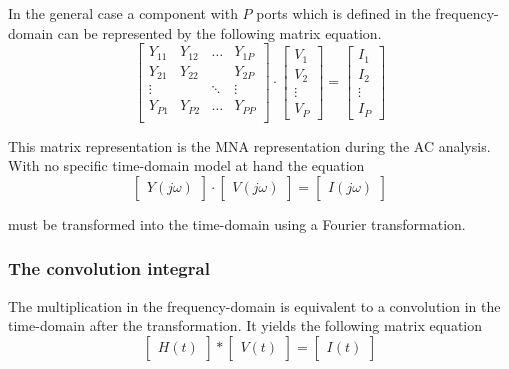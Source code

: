 In the general case a component with $P$ ports which is defined in the
frequency-domain can be represented by the following matrix equation.
\begin{equation}
\begin{bmatrix}
Y_{11} & Y_{12} & \ldots & Y_{1P}\\
Y_{21} & Y_{22} &  & Y_{2P}\\
\vdots &  & \ddots & \vdots\\
Y_{P1} & Y_{P2} & \ldots & Y_{PP}\\
\end{bmatrix}
\cdot
\begin{bmatrix}
V_{1}\\
V_{2}\\
\vdots\\
V_{P}
\end{bmatrix}
=
\begin{bmatrix}
I_{1}\\
I_{2}\\
\vdots\\
I_{P}
\end{bmatrix}
\end{equation}

This matrix representation is the MNA representation during the AC
analysis.  With no specific time-domain model at hand the equation
\begin{equation}
\begin{bmatrix}
Y\left(j\omega\right)
\end{bmatrix}
\cdot
\begin{bmatrix}
V\left(j\omega\right)
\end{bmatrix}
=
\begin{bmatrix}
I\left(j\omega\right)
\end{bmatrix}
\end{equation}

must be transformed into the time-domain using a Fourier
transformation.

\subsubsection{The convolution integral}

The multiplication in the frequency-domain is equivalent to a
convolution in the time-domain after the transformation.  It yields
the following matrix equation
\begin{equation}
\begin{bmatrix}
H\left(t\right)
\end{bmatrix}
*
\begin{bmatrix}
V\left(t\right)
\end{bmatrix}
=
\begin{bmatrix}
I\left(t\right)
\end{bmatrix}
\end{equation}

